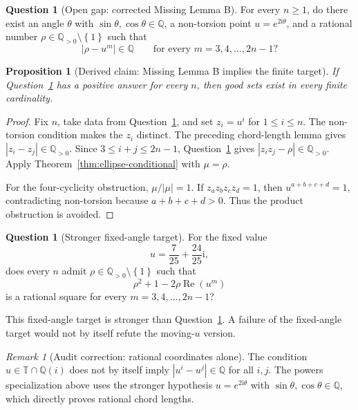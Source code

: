 \documentclass[11pt]{article}
\newtheorem{proposition}[theorem]{Proposition}
\theoremstyle{definition}
\newtheorem{question}[theorem]{Question}
\theoremstyle{remark}
\newtheorem{remark}[theorem]{Remark}
\newcommand{\Q}{\mathbb{Q}}
\newcommand{\T}{\mathbb{T}}
\newcommand{\ii}{\mathrm{i}}
\newcommand{\abs}[1]{\left|#1\right|}
\newcommand{\set}[1]{\left\{#1\right\}}
\begin{document}
\begin{question}[Open gap: corrected Missing Lemma B]\label{q:missing-b}
For every \(n\ge 1\), do there exist an angle \(\theta\) with
\(\sin\theta,\cos\theta\in\Q\), a non-torsion point \(u=e^{2\ii\theta}\), and a
rational number \(\rho\in\Q_{>0}\setminus\set{1}\) such that
\[
\abs{\rho-u^m}\in\Q
\qquad
\text{for every }m=3,4,\ldots,2n-1?
\]
\end{question}

\begin{proposition}[Derived claim: Missing Lemma B implies the finite target]
If Question~\ref{q:missing-b} has a positive answer for every \(n\), then good
sets exist in every finite cardinality.
\end{proposition}

\begin{proof}
Fix \(n\), take data from Question~\ref{q:missing-b}, and set \(z_i=u^i\) for
\(1\le i\le n\).  The non-torsion condition makes the \(z_i\) distinct.  The
preceding chord-length lemma gives \(\abs{z_i-z_j}\in\Q_{>0}\).  Since
\(3\le i+j\le 2n-1\), Question~\ref{q:missing-b} gives
\(\abs{z_i z_j-\rho}\in\Q_{>0}\).  Apply Theorem~\ref{thm:ellipse-conditional}
with \(\mu=\rho\).

For the four-cyclicity obstruction, \(\mu/\abs\mu=1\).  If
\(z_a z_b z_c z_d=1\), then \(u^{a+b+c+d}=1\), contradicting non-torsion because
\(a+b+c+d>0\).  Thus the product obstruction is avoided.
\end{proof}

\begin{question}[Stronger fixed-angle target]
For the fixed value
\[
u=\frac7{25}+\frac{24}{25}\ii,
\]
does every \(n\) admit \(\rho\in\Q_{>0}\setminus\set{1}\) such that
\[
\rho^2+1-2\rho\operatorname{Re}(u^m)
\]
is a rational square for every \(m=3,4,\ldots,2n-1\)?
\end{question}

This fixed-angle target is stronger than Question~\ref{q:missing-b}.  A failure
of the fixed-angle target would not by itself refute the moving-\(u\) version.

\begin{remark}[Audit correction: rational coordinates alone]
The condition \(u\in\T\cap\Q(i)\) does not by itself imply
\(\abs{u^i-u^j}\in\Q\) for all \(i,j\).  The powers specialization above uses the
stronger hypothesis \(u=e^{2\ii\theta}\) with \(\sin\theta,\cos\theta\in\Q\), which
directly proves rational chord lengths.
\end{remark}
\end{document}

